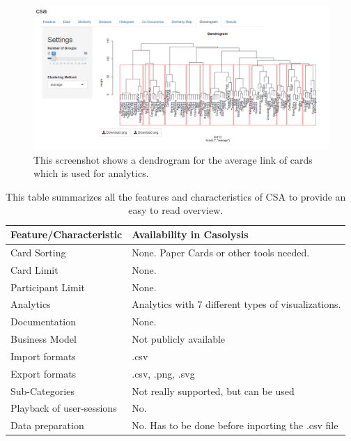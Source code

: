 \begin{figure}[tp] 
\centering
\includegraphics[keepaspectratio,width=\linewidth,height=\halfh]{images/csa-dendrogram.png}
\caption[CSA Dendrogram] { This screenshot shows a dendrogram 
for the average link of cards which is used for analytics.
 }
\label{fig:CSA3}
\end{figure}

\begin{table}[tp]
\centering
\begin{tabularx}
{\linewidth}{|l|X|}
\hline \textbf{Feature/Characteristic} & \textbf{Availability in Casolysis} \\ 
\hline Card Sorting & None. Paper Cards or other tools needed. \\ 
\hline Card Limit & None. \\
\hline Participant Limit & None. \\
\hline Analytics & Analytics with 7 different types of visualizations. \\ 
\hline Documentation & None. \\
\hline Business Model & Not publicly available \\
\hline Import formats & .csv\\ 
\hline Export formats & .csv, .png, .svg \\ 
\hline Sub-Categories & Not really supported, but can be used \\ 
\hline Playback of user-sessions & No. \\ 
\hline Data preparation & No. Has to be done before inporting the .csv file \\ 
\hline
\end{tabularx} 
\caption[Feature summary of CSA] 
{ 
This table summarizes all the features and characteristics of CSA
to provide an easy to read overview.
}
\label{tab:features-CSA}
\end{table}

